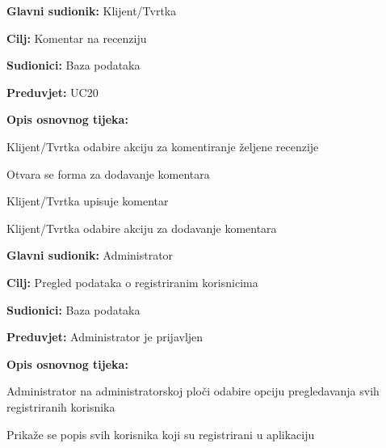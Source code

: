 \noindent {}
\begin{packed_item}
	
	\item \textbf{Glavni sudionik:} Klijent/Tvrtka
	\item  \textbf{Cilj:} Komentar na recenziju
	\item  \textbf{Sudionici:} Baza podataka
	\item  \textbf{Preduvjet:} UC20
	\item  \textbf{Opis osnovnog tijeka:}
	
	\item[] \begin{packed_enum}
		
		\item Klijent/Tvrtka odabire akciju za komentiranje željene recenzije
		\item Otvara se forma za dodavanje komentara
		\item Klijent/Tvrtka upisuje komentar
		\item Klijent/Tvrtka odabire akciju za dodavanje komentara
		
	\end{packed_enum}
\end{packed_item}

\pagebreak

\noindent {}
\begin{packed_item}
	
	\item \textbf{Glavni sudionik:} Administrator
	\item  \textbf{Cilj:} Pregled podataka o registriranim korisnicima
	\item  \textbf{Sudionici:} Baza podataka
	\item  \textbf{Preduvjet:} Administrator je prijavljen
	\item  \textbf{Opis osnovnog tijeka:}
	
	\item[] \begin{packed_enum}
		
		\item Administrator na administratorskoj ploči odabire opciju pregledavanja svih registriranih korisnika 
		\item Prikaže se popis svih korisnika koji su registrirani u aplikaciju
	\end{packed_enum}
\end{packed_item}




